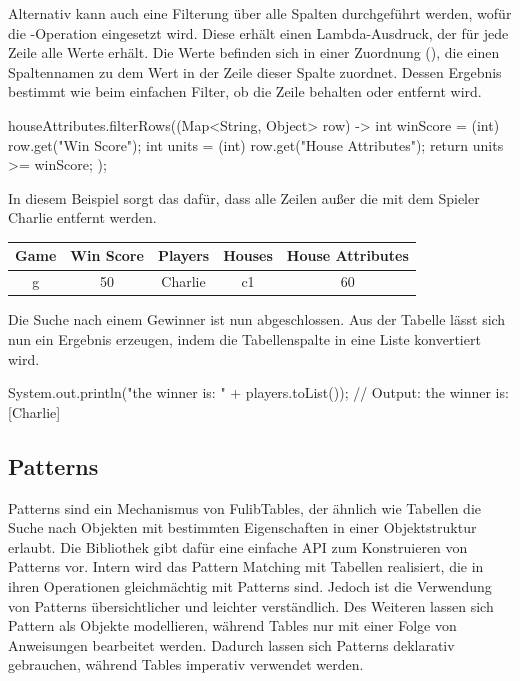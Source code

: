 Alternativ kann auch eine Filterung über alle Spalten durchgeführt werden, wofür die -Operation eingesetzt wird.
Diese erhält einen Lambda-Ausdruck, der für jede Zeile alle Werte erhält.
Die Werte befinden sich in einer Zuordnung (), die einen Spaltennamen zu dem Wert in der Zeile dieser Spalte zuordnet.
Dessen Ergebnis bestimmt wie beim einfachen Filter, ob die Zeile behalten oder entfernt wird.

\begin{jcodeblock}
    houseAttributes.filterRows((Map<String, Object> row) -> {
        int winScore = (int) row.get("Win Score");
        int units = (int) row.get("House Attributes");
        return units >= winScore;
    });
\end{jcodeblock}

In diesem Beispiel sorgt das dafür, dass alle Zeilen außer die mit dem Spieler Charlie entfernt werden.

\begin{tabular}{|c|c|c|c|c|}
    \hline
    \textbf{Game} & \textbf{Win Score} & \textbf{Players} & \textbf{Houses} & \textbf{House Attributes} \\
    \hline
    g & 50 & Charlie & c1 & 60 \\
    \hline
\end{tabular}

Die Suche nach einem Gewinner ist nun abgeschlossen.
Aus der Tabelle lässt sich nun ein Ergebnis erzeugen, indem die Tabellenspalte  in eine Liste konvertiert wird.

\begin{jcodeblock}
    System.out.println("the winner is: " + players.toList());
    // Output: the winner is: [Charlie]
\end{jcodeblock}

\subsection{Patterns}\label{subsec:patterns}

Patterns sind ein Mechanismus von FulibTables, der ähnlich wie Tabellen die Suche nach Objekten mit bestimmten Eigenschaften in einer Objektstruktur erlaubt.
Die Bibliothek gibt dafür eine einfache API zum Konstruieren von Patterns vor.
Intern wird das Pattern Matching mit Tabellen realisiert,
die in ihren Operationen gleichmächtig mit Patterns sind.
Jedoch ist die Verwendung von Patterns übersichtlicher und leichter verständlich.
Des Weiteren lassen sich Pattern als Objekte modellieren,
während Tables nur mit einer Folge von Anweisungen bearbeitet werden.
Dadurch lassen sich Patterns deklarativ gebrauchen, während Tables imperativ verwendet werden.

